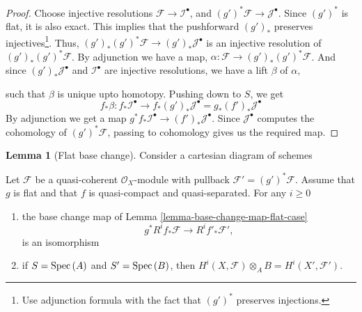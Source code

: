 \documentclass[11pt]{amsart}
\newcommand{\Spec}{{\rm Spec \,}}
\newcommand{\sF}{{\mathcal F}}
\newcommand{\sI}{{\mathcal I}}
\newcommand{\sJ}{{\mathcal J}}
\theoremstyle{definition}
\newtheorem{lemma}[theorem]{Lemma}
\begin{document}
\begin{proof}
	Choose injective resolutions $\sF\rightarrow \sI^{\bullet}$, and $(g')^*\sF\rightarrow \sJ^{\bullet}$. Since $(g')^*$ is flat, it is also exact. This implies that the pushforward $(g')_*$ preserves injectives\footnote{Use adjunction formula with the fact that $(g')^*$ preserves injections.}. Thus, $(g')_*(g')^*\sF\rightarrow (g')_*\sJ^{\bullet}$ is an injective resolution of $(g')_*(g')^*\sF$. By adjunction we have a map, $\alpha: \sF \rightarrow (g')_*(g')^*\sF$. And since $(g')_*\sJ^{\bullet}$ and $\sI^{\bullet}$ are injective resolutions, we have a lift $\beta$ of $\alpha$,
	\begin{center}
	\end{center}
	such that $\beta$ is unique upto homotopy. Pushing down to $S$, we get
	\[f_*\beta :
	f_*\mathcal{I}^\bullet
	\longrightarrow
	f_*(g')_*\mathcal{J}^\bullet
	=
	g_*(f')_*\mathcal{J}^\bullet
	\]
	By adjunction we get a map $g^*f_*\sI^\bullet \rightarrow (f')_*\sJ^\bullet$. Since $\sJ^\bullet$ computes the cohomology of $(g')^*\sF$, passing to cohomology gives us the required map.
\end{proof}


\begin{lemma}[Flat base change]\cite[Tag 02KH]{stacks-project}
	\label{lemma-flat-base-change-cohomology}
	Consider a cartesian diagram of schemes
	\begin{center}
	\end{center}
	Let $\mathcal{F}$ be a quasi-coherent $\mathcal{O}_X$-module
	with pullback $\mathcal{F}' = (g')^*\mathcal{F}$.
	Assume that $g$ is flat and that $f$ is quasi-compact and quasi-separated.
	For any $i \geq 0$
	\begin{enumerate}
		\item the base change map of Lemma \ref{lemma-base-change-map-flat-case}
		$$
		g^*R^if_*\mathcal{F} \longrightarrow R^if'_*\mathcal{F}',
		$$
		is an isomorphism
		\item if $S = \Spec(A)$ and $S' = \Spec(B)$, then
		$H^i(X, \mathcal{F}) \otimes_A B = H^i(X', \mathcal{F}')$.
	\end{enumerate}
\end{lemma}
\end{document}
